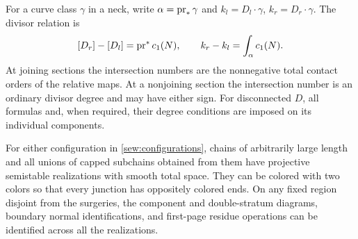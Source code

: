 For a curve class $\gamma$ in a neck, write $\alpha=\operatorname{pr}_*\gamma$ and
$k_l=D_l\cdot\gamma$, $k_r=D_r\cdot\gamma$.  The divisor relation is
\begin{equation}\label{sew:flux}
 [D_r]-[D_l]=\operatorname{pr}^*c_1(N),\qquad
 k_r-k_l=\int_\alpha c_1(N).
\end{equation}
At joining sections the intersection numbers are the nonnegative total
contact orders of the relative maps.  At a nonjoining section the
intersection number is an ordinary divisor degree and may have either
sign.  For disconnected $D$, all formulas and, when required, their
degree conditions are imposed on its individual components.

\begin{lemma}\label{sew:geometry}
For either configuration in \cref{sew:configurations}, chains of
arbitrarily large length and all unions of capped subchains obtained
from them have projective semistable realizations with smooth total
space.  They can be colored with two colors so that every junction has
oppositely colored ends.  On any fixed region disjoint from the
surgeries, the component and double-stratum diagrams, boundary normal
identifications, and first-page residue operations can be identified
across all the realizations.
\end{lemma}

